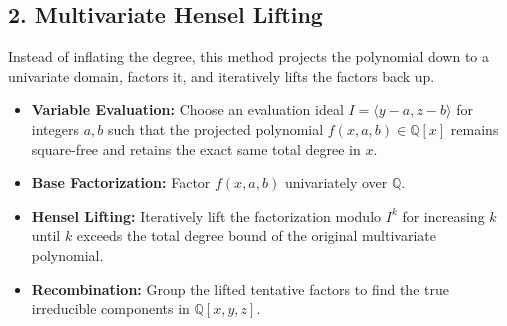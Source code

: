 \documentclass{article}
\begin{document}
\subsection*{2. Multivariate Hensel Lifting}
Instead of inflating the degree, this method projects the polynomial down to a univariate domain, factors it, and iteratively lifts the factors back up.

\begin{itemize}
    \item \textbf{Variable Evaluation:} Choose an evaluation ideal $I = \langle y-a, z-b \rangle$ for integers $a,b$ such that the projected polynomial $f(x,a,b) \in \mathbb{Q}[x]$ remains square-free and retains the exact same total degree in $x$.
    \item \textbf{Base Factorization:} Factor $f(x,a,b)$ univariately over $\mathbb{Q}$.
    \item \textbf{Hensel Lifting:} Iteratively lift the factorization modulo $I^k$ for increasing $k$ until $k$ exceeds the total degree bound of the original multivariate polynomial.
    \item \textbf{Recombination:} Group the lifted tentative factors to find the true irreducible components in $\mathbb{Q}[x,y,z]$.
\end{itemize}
\end{document}

